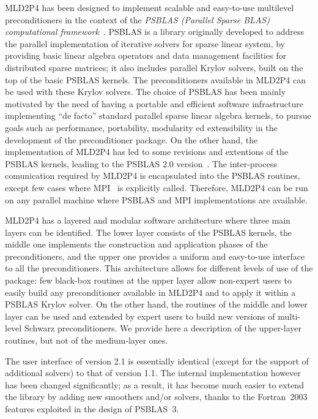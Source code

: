 MLD2P4 has been designed to implement scalable and easy-to-use
multilevel preconditioners in the context of the \emph{PSBLAS
  (Parallel Sparse BLAS) computational framework}~\cite{psblas_00,PSBLAS3}. 
PSBLAS is a library originally developed to address the parallel implementation of
iterative solvers for sparse linear system, by providing basic linear algebra
operators and data management facilities for distributed sparse matrices; it
also includes parallel Krylov solvers, built on the top of the basic PSBLAS kernels.
The preconditioners available in MLD2P4 can be used with these Krylov solvers.
The choice of PSBLAS has been mainly motivated by the need of having
a portable and efficient software infrastructure implementing ``de facto'' standard
parallel sparse linear algebra kernels, to pursue goals such as performance,
portability, modularity ed extensibility in the development of the preconditioner
package. On the other hand, the implementation of MLD2P4 has led to some
revisions and extentions of the PSBLAS kernels, leading to the
 PSBLAS 2.0 version~\cite{PSBLASGUIDE}. The inter-process comunication required
by MLD2P4 is encapsulated into the PSBLAS routines, except few cases where
MPI~\cite{MPI1} is explicitly called. Therefore, MLD2P4 can be run on any parallel
machine where PSBLAS and MPI implementations are available.

MLD2P4 has a layered and modular software architecture where three main layers can be identified. 
The lower layer consists of the PSBLAS kernels, the middle one implements
the construction and application phases of the preconditioners, and the upper one
provides a uniform and easy-to-use interface to all the preconditioners. 
This architecture allows for different levels of use of the package:
few black-box routines at the upper layer allow non-expert users to easily
build any preconditioner available in MLD2P4 and to apply it within a PSBLAS Krylov solver.
On the other hand, the routines of the middle and lower layer can be used and extended
by expert users to build new versions of multi-level Schwarz preconditioners.
We provide here a description of the upper-layer routines, but not of the
medium-layer ones.%

The user interface of version 2.1 is essentially identical (except for
the support of additional solvers) to that of
version 1.1.  The internal implementation however has been changed
significantly; as a result, it has become much easier to extend the library by
adding new smoothers and/or solvers, thanks to the Fortran~2003 features
exploited in the design of PSBLAS~3. 

